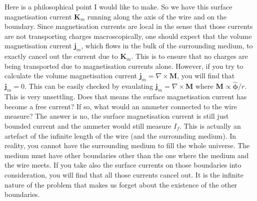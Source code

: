 \documentclass[a4paper]{article}
\begin{document}
Here is a philosophical point I would like to make.
So we have this surface magnetisation current $\mathbf{K}_m$ running along the axis of the wire and on the boundary.
Since magnetisation currents are local in the sense that those currents are not transporting charges macroscopically, one should expect that the volume magnetisation current $\mathbf{j}_m$, which flows in the bulk of the surrounding medium, to exactly cancel out the current due to $\mathbf{K}_m$. 
This is to ensure that no charges are being transported due to magnetisation currents alone. 
However, if you try to calculate the volume magnetisation current $\mathbf{j}_m = \nabla \times \mathbf{M}$, you will find that $\mathbf{j}_m = 0$. 
This can be easily checked by evaulating $\mathbf{j}_m = \nabla  \times \mathbf{M}$ where $\mathbf{M} \propto \hat{\mathbf{\phi}}/r$. 
This is very unsettling.
Does that means the surface magnetisation current has become a free current? If so, what would an ammeter connected to the wire measure? 
The answer is no, the surface magnetisation current is still just bounded current and the ammeter would still measure $I_f$.
This is actually an artefact of the infinite length of the wire (and the surrounding medium). In reality, you cannot have the surrounding medium to fill the whole universe. The medium must have other boundaries other than the one where the medium and the wire meets. If you take also the surface currents on those boundaries into consideration, you will find that all those currents cancel out. 
It is the infinite nature of the problem that makes us forget about the existence of the other boundaries.
\end{document}
